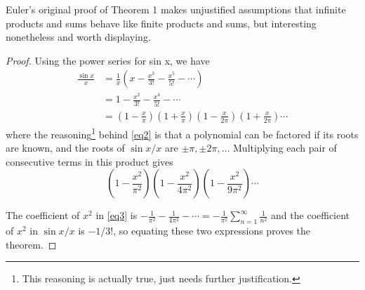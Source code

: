 \documentclass{article}
\begin{document}
Euler's original proof of Theorem 1 makes unjustified assumptions that infinite products and sums behave like finite products and sums, but interesting nonetheless and worth displaying.

\begin{proof}
Using the power series for sin x, we have
\begin{align}
    \frac{\sin x}{x} & = \frac{1}{x} \left(x-\frac{x^3}{3!}-\frac{x^5}{5!}-\cdots \right) \nonumber \\
    & = 1 - \frac{x^2}{3!} - \frac{x^4}{5!} - \cdots \nonumber \\
    & = \left(1-\frac{x}{\pi}\right) \left(1+\frac{x}{\pi}\right) \left(1-\frac{x}{2\pi}\right) \left(1+\frac{x}{2\pi}\right)\cdots \label{eq2}
\end{align}
where the reasoning\footnote{This reasoning is actually true, just needs further justification.} behind \eqref{eq2} is that a polynomial can be factored if its roots are known, and the roots of \(\sin x/x\) are \(\pm \pi, \pm 2\pi, \ldots\) Multiplying each pair of consecutive terms in this product gives
\begin{equation}
\left(1-\frac{x^2}{\pi^2}\right) \left(1-\frac{x^2}{4\pi^2}\right) \left(1-\frac{x^2}{9\pi^2}\right) \cdots \label{eq3}
\end{equation}

The coefficient of \(x^2\) in \eqref{eq3} is
$\displaystyle -\frac{1}{\pi^2} -\frac{1}{4\pi^2}{} -\cdots = -\frac{1}{\pi^2} \sum\limits_{n=1}^{\infty} \frac{1}{n^2}$ and the coefficient of \(x^2\) in \(\sin x/x\) is \(-1/3!\), so equating these two expressions proves the theorem.
\end{proof}

\printindex
\end{document}
